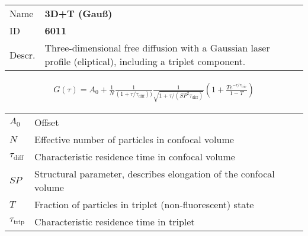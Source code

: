 \noindent \begin{tabular}{lp{}}
Name & \textbf{3D+T (Gauß)} \\ 
ID & \textbf{6011} \\ 
Descr. &  Three-dimensional free diffusion with a Gaussian laser profile (eliptical), including a triplet component. \\ 
\end{tabular}
\begin{align}
G(\tau) = A_0 + \frac{1}{N} \frac{1}{(1+\tau/\tau_\mathrm{diff}))} \frac{1}{\sqrt{1+\tau/(\mathit{SP}^2 \tau_\mathrm{diff})}} \left(1 + \frac{T e^{-\tau/\tau_\mathrm{trip}}}{1-T}  \right)
\end{align} 
\begin{center}
\begin{tabular}{ll}
$A_0$ & Offset \\ 
$N$ & Effective number of particles in confocal volume \\ 
$\tau_\mathrm{diff}$ &  Characteristic residence time in confocal volume \\ 
$\mathit{SP}$ & Structural parameter, describes elongation of the confocal volume \\
$T$ &  Fraction of particles in triplet (non-fluorescent) state\\ 
$\tau_\mathrm{trip}$ &  Characteristic residence time in triplet \\
\end{tabular}
\end{center}
\vspace{2em}


